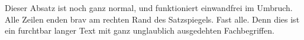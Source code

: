 \documentclass[draft,a6paper]%
{scrartcl}
\begin{document}
Dieser Absatz ist noch ganz 
normal, und funktioniert 
einwandfrei im Umbruch. Alle
Zeilen enden brav am rechten
Rand des Satzspiegels. Fast
alle. Denn dies ist ein 
furchtbar langer Text mit 
ganz unglaublich ausgedehten
Fachbegriffen.
\end{document}
